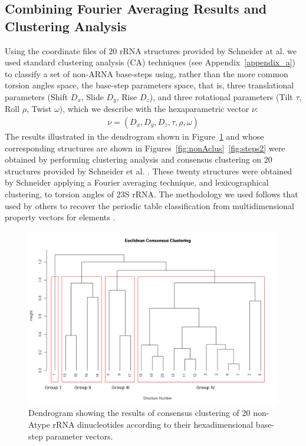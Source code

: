 \subsection{Combining Fourier Averaging Results and Clustering Analysis}
Using the coordinate files of 20 rRNA structures provided by Schneider
at al.\cite{schneider2004}  we used standard  clustering analysis (CA)
techniques  (see  Appendix~\ref{appendix_a})  to  classify  a  set  of
non-ARNA base-steps using, rather  than the more common torsion angles
space, the  base-step parameters  space, that is,  three translational
parameters  (Shift   $D_x$,  Slide  $D_y$,  Rise   $D_z$),  and  three
rotational  parameters  (Tilt $\tau$,  Roll  $\rho$, Twist  $\omega$),
which we describe with the hexaparametric vector $\nu$:
\begin{gather}
 \nu = (D_x, D_y, D_z, \tau, \rho, \omega)
\end{gather}
The    results    illustrated    in    the   dendrogram    shown    in
Figure~\ref{fig:eucl_cons}  and  whose  corresponding  structures  are
shown in  Figures~\ref{fig:nonAclus}~\ref{fig:steps2} were obtained by
performing  clustering   analysis  and  consensus   clustering  on  20
structures provided by  Schneider et al.  \cite{schneider2004}.  These
twenty  structures  were  obtained  by Schneider  applying  a  Fourier
averaging technique, and lexicographical clustering, to torsion angles
of 23S rRNA.   The methodology we used follows that  used by others to
recover  the  periodic   table  classification  from  multidimensional
property vectors for elements \cite{restrepo2004, restrepo2006}.
\begin{figure}[htbp]
 \centering
\includegraphics[angle=90, scale=0.6]{Chapter2/eucli_cons_nonA-RNA.png}
\caption{Dendrogram showing the results  of consensus clustering of 20
non-Atype  rRNA  dinucleotides   according  to  their  hexadimensional
base-step parameter vectors.}
 \label{fig:eucl_cons}
\end{figure}


